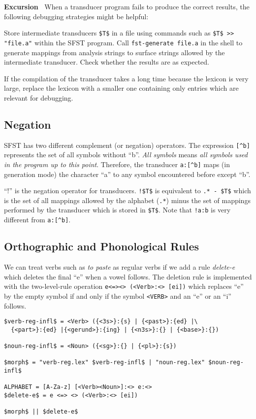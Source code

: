 \documentclass[11pt]{article}
\newenvironment{excursion}{

  \hrulefill\nopagebreak

  \textbf{Excursion~}}
{

  \nopagebreak\hrulefill\vspace{0.2cm}

}
\begin{document}
\begin{excursion}
  When a transducer program fails to produce the correct results, the
  following debugging strategies might be helpful:
  
  Store intermediate transducers \texttt{\$T\$} in a file using commands
  such as \verb#$T$ >> "file.a"# within the SFST program. Call
  \texttt{fst-generate file.a} in the shell to generate mappings from
  analysis strings to surface strings allowed by the intermediate
  transducer. Check whether the results are as expected.
  
  If the compilation of the transducer takes a long time because the
  lexicon is very large, replace the lexicon with a smaller one
  containing only entries which are relevant for debugging.
\end{excursion}


\subsection{Negation}

SFST has two different complement (or negation) operators. The
expression \verb#[^b]# represents the set of all symbols without
``b''. \emph{All symbols} means \emph{all symbols used in the program
  up to this point}. Therefore, the transducer \verb#a:[^b]# maps (in
generation mode) the character ``a'' to any symbol encountered before
except ``b''.

``!'' is the negation operator for transducers.  \verb#!$T$# is
equivalent to \verb#.* - $T$# which is the set of all mappings allowed
by the alphabet (\verb#.*#) minus the set of mappings performed by the
transducer which is stored in \verb#$T$#. Note that \verb#!a:b# is
very different from \verb#a:[^b]#.



\subsection{Orthographic and Phonological Rules}

We can treat verbs such as \emph{to paste} as regular verbs if we add
a rule \emph{delete-e} which deletes the final ``e'' when a vowel
follows. The deletion rule is implemented with the two-level-rule
operation \verb#e<=><> (<Verb>:<> [ei])# which replaces ``e'' by the
empty symbol if and only if the symbol \verb#<VERB># and an ``e'' or an
``i'' follows.

\begin{verbatim}
$verb-reg-infl$ = <Verb> ({<3s>}:{s} | {<past>}:{ed} |\
  {<part>}:{ed} |{<gerund>}:{ing} | {<n3s>}:{} | {<base>}:{})

$noun-reg-infl$ = <Noun> ({<sg>}:{} | {<pl>}:{s})

$morph$ = "verb-reg.lex" $verb-reg-infl$ | "noun-reg.lex" $noun-reg-infl$

ALPHABET = [A-Za-z] [<Verb><Noun>]:<> e:<>
$delete-e$ = e <=> <> (<Verb>:<> [ei])

$morph$ || $delete-e$
\end{verbatim}
\end{document}
